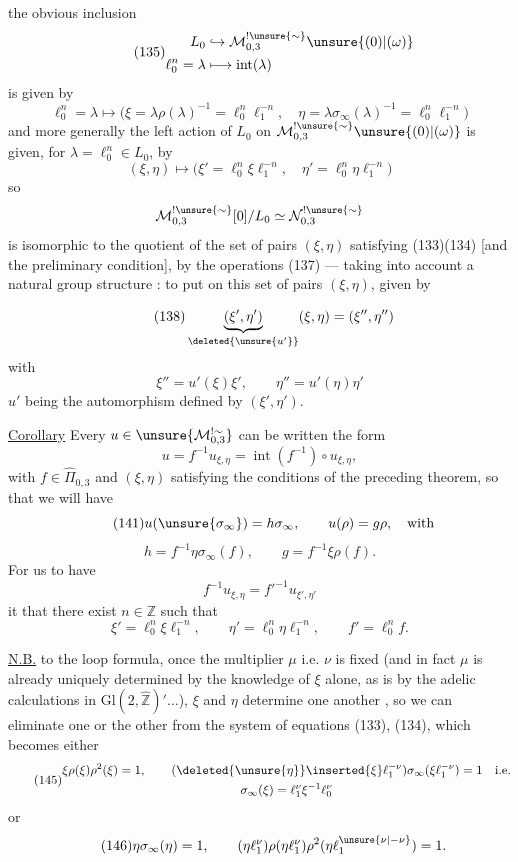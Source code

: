  the obvious inclusion
\[
\tag{135}
\begin{aligned}
L_0&\hookrightarrow\mathcal M_{0,3}^{!\unsure{\sim}}\unsure{(0)|(\omega)}\\
\ell_0^n=\lambda&\longmapsto\operatorname{int}(\lambda)
\end{aligned}
\]
is given by
\[
\tag{136}
\ell_0^n=\lambda\longmapsto
\bigl(\xi=\lambda\rho(\lambda)^{-1}=\ell_0^n\ell_1^{-n},
\quad\eta=\lambda\sigma_\infty(\lambda)^{-1}=\ell_0^n\ell_1^{-n}\bigr)
\]
and more generally the left action of $L_0$ on
$\mathcal M_{0,3}^{!\unsure{\sim}}\unsure{(0)|(\omega)}$ is given,
for $\lambda=\ell_0^n\in L_0$, by
\[
\tag{137}
(\xi,\eta)\longmapsto
\bigl(\xi'=\ell_0^n\xi\ell_1^{-n},\quad
\eta'=\ell_0^n\eta\ell_1^{-n}\bigr)
\]
so
\[
\mathcal M_{0,3}^{!\unsure{\sim}}[0]/L_0
\simeq\mathcal N_{0,3}^{!\unsure{\sim}}
\]
is isomorphic to the quotient of the set of pairs $(\xi,\eta)$
satisfying (133)(134) [and the preliminary condition], by the operations
(137) --- taking into account a 
natural group structure : to put on this set of pairs
$(\xi,\eta)$, given by


\[
\tag{138}
\underbrace{(\xi',\eta')}_{\deleted{\unsure{u'}}}(\xi,\eta)=(\xi'',\eta'')
\]
with
\[
\tag{139}
\xi''=u'(\xi)\xi',\qquad \eta''=u'(\eta)\eta'
\]
$u'$ being the automorphism defined by $(\xi',\eta')$.

\uline{Corollary} Every $u\in\unsure{\mathcal M_{0,3}^{!\sim}}$ can be written  the form
\[
\tag{140}
u=f^{-1}u_{\xi,\eta}=\operatorname{int}(f^{-1})\circ u_{\xi,\eta},
\]
with $f\in\widehat{\Pi}_{0,3}$ and $(\xi,\eta)$ satisfying the conditions of the preceding theorem, so that we will have
\[
\tag{141}
u(\unsure{\sigma_\infty})=h\sigma_\infty,\qquad u(\rho)=g\rho,\quad\text{with}
\]
\[
\tag{143}
h=f^{-1}\eta\sigma_\infty(f),\qquad g=f^{-1}\xi\rho(f).
\]
For us to have
\[
f^{-1}u_{\xi,\eta}=f'^{-1}u_{\xi',\eta'}
\]
it  that there exist $n\in\mathbb Z$ such that
\[
\tag{144}
\xi'=\ell_0^n\xi\ell_1^{-n},\qquad
\eta'=\ell_0^n\eta\ell_1^{-n},\qquad f'=\ell_0^n f.
\]

\uline{N.B.}  to the loop formula, once the multiplier $\mu$ i.e. $\nu$ is fixed (and in fact $\mu$ is already uniquely determined by the knowledge of $\xi$ alone, as is  by the adelic calculations in $\mathrm{Gl}(2,\widehat{\mathbb Z})'\ldots$), $\xi$ and $\eta$ determine one another , so we can eliminate one or the other from the system of equations (133), (134), which becomes either
\[
\tag{145}
\begin{gathered}
\xi\rho(\xi)\rho^2(\xi)=1,\qquad
(\deleted{\unsure{\eta}}\inserted{\xi}\ell_1^{-\nu})\sigma_\infty(\xi\ell_1^{-\nu})=1
\quad\text{i.e.}\\
\sigma_\infty(\xi)=\ell_1^\nu\xi^{-1}\ell_0^\nu
\end{gathered}
\]
or
\[
\tag{146}
\eta\sigma_\infty(\eta)=1,\qquad
(\eta\ell_1^\nu)\rho(\eta\ell_1^\nu)\rho^2(\eta\ell_1^{\unsure{\nu|-\nu}})=1.
\]

